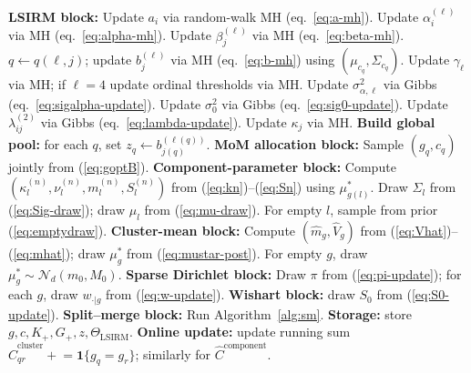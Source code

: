\documentclass[11pt]{article}
\newcommand{\ind}{\mathbf{1}}
\begin{document}
\begin{algorithm}[H]
\caption{One full sweep of the v14 MCMC sampler.}
\label{alg:sweep}
\begin{algorithmic}[1]
\State \textbf{LSIRM block:}
   \State Update $a_i$ via random-walk MH (eq.~\ref{eq:a-mh}).
\EndFor
{}
    \State Update $\alpha_i^{(\ell)}$ via MH (eq.~\ref{eq:alpha-mh}). \EndFor
    \State Update $\beta_j^{(\ell)}$ via MH (eq.~\ref{eq:beta-mh}). \EndFor
      \State $q\gets q(\ell,j)$;
             update $b_j^{(\ell)}$ via MH (eq.~\ref{eq:b-mh}) using $(\mu_{c_q},\Sigma_{c_q})$.
   \EndFor
   \State Update $\gamma_\ell$ via MH; if $\ell=4$ update ordinal thresholds via MH.
   \State Update $\sigma_{\alpha,\ell}^2$ via Gibbs (eq.~\ref{eq:sigalpha-update}).
\EndFor
\State Update $\sigma_0^2$ via Gibbs (eq.~\ref{eq:sig0-update}).
   \State Update $\lambda_{ij}^{(2)}$ via Gibbs (eq.~\ref{eq:lambda-update}).
\EndFor
{} \State Update $\kappa_j$ via MH. \EndFor
\State \textbf{Build global pool:} for each $q$, set $z_q\gets b_{j(q)}^{(\ell(q))}$.
\State \textbf{MoM allocation block:}
   \State Sample $(g_q,c_q)$ jointly from (\ref{eq:goptB}). 
\EndFor
\State \textbf{Component-parameter block:}
   \State Compute $(\kappa_l^{(n)},\nu_l^{(n)},m_l^{(n)},S_l^{(n)})$ from (\ref{eq:kn})--(\ref{eq:Sn}) using $\mu_{g(l)}^*$.
   \State Draw $\Sigma_l$ from (\ref{eq:Sig-draw}); draw $\mu_l$ from (\ref{eq:mu-draw}).
\EndFor
\State For empty $l$, sample from prior (\ref{eq:emptydraw}).
\State \textbf{Cluster-mean block:}
   \State Compute $(\hat m_g,\hat V_g)$ from (\ref{eq:Vhat})--(\ref{eq:mhat}); draw $\mu_g^*$ from (\ref{eq:mustar-post}).
\EndFor
\State For empty $g$, draw $\mu_g^*\sim\mathcal{N}_d(m_0,M_0)$.
\State \textbf{Sparse Dirichlet block:}
\State Draw $\pi$ from (\ref{eq:pi-update}); for each $g$, draw $w_{\cdot|g}$ from (\ref{eq:w-update}).
\State \textbf{Wishart block:} draw $S_0$ from (\ref{eq:S0-update}).
\State \textbf{Split--merge block:}
   \State Run Algorithm~\ref{alg:sm}.
\EndFor
\State \textbf{Storage:} store $g, c, K_+, G_+, z, \Theta_{\text{LSIRM}}$.
\State \textbf{Online update:} update running sum
   $\widehat C_{qr}^{\mathrm{cluster}}\!+\!\!=\ind\{g_q=g_r\}$;
   similarly for $\widehat C^{\mathrm{component}}$.
\end{algorithmic}
\end{algorithm}
\end{document}
